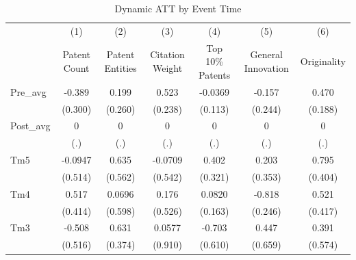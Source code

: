 \begin{longtable}{l*{6}{c}}
    \caption{Dynamic ATT by Event Time}
    \label{tab:dynamic_att} \\

\hline\hline
                    &\multicolumn{1}{c}{(1)}&\multicolumn{1}{c}{(2)}&\multicolumn{1}{c}{(3)}&\multicolumn{1}{c}{(4)}&\multicolumn{1}{c}{(5)}&\multicolumn{1}{c}{(6)}\\
                    &\multicolumn{1}{c}{Patent Count}&\multicolumn{1}{c}{Patent Entities}&\multicolumn{1}{c}{Citation Weight}&\multicolumn{1}{c}{Top 10\% Patents}&\multicolumn{1}{c}{General Innovation}&\multicolumn{1}{c}{Originality}\\
\hline
Pre\_avg            &      -0.389         &       0.199         &       0.523\sym{**} &     -0.0369         &      -0.157         &       0.470\sym{**} \\
                    &     (0.300)         &     (0.260)         &     (0.238)         &     (0.113)         &     (0.244)         &     (0.188)         \\
[1em]
Post\_avg           &           0         &           0         &           0         &           0         &           0         &           0         \\
                    &         (.)         &         (.)         &         (.)         &         (.)         &         (.)         &         (.)         \\
[1em]
Tm5                 &     -0.0947         &       0.635         &     -0.0709         &       0.402         &       0.203         &       0.795\sym{**} \\
                    &     (0.514)         &     (0.562)         &     (0.542)         &     (0.321)         &     (0.353)         &     (0.404)         \\
[1em]
Tm4                 &       0.517         &      0.0696         &       0.176         &      0.0820         &      -0.818\sym{***}&       0.521         \\
                    &     (0.414)         &     (0.598)         &     (0.526)         &     (0.163)         &     (0.246)         &     (0.417)         \\
[1em]
Tm3                 &      -0.508         &       0.631\sym{*}  &      0.0577         &      -0.703         &       0.447         &       0.391         \\
                    &     (0.516)         &     (0.374)         &     (0.910)         &     (0.610)         &     (0.659)         &     (0.574)         \\

\end{longtable}
